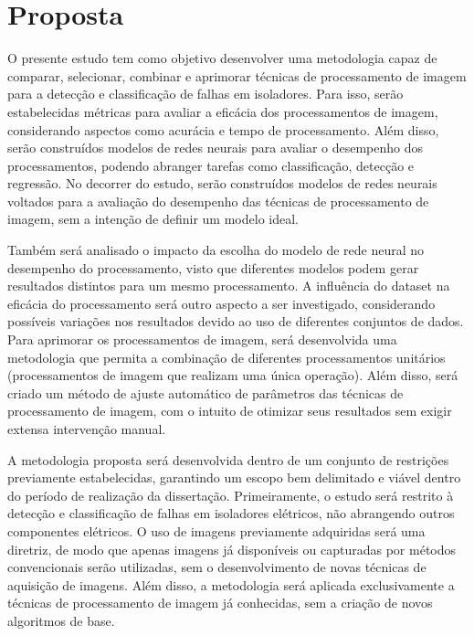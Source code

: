 \maketitle

\newpage

\section{Proposta}

O presente estudo tem como objetivo desenvolver uma metodologia capaz de comparar, selecionar, combinar e aprimorar técnicas de processamento de imagem para a detecção e classificação de falhas em isoladores. Para isso, serão estabelecidas métricas para avaliar a eficácia dos processamentos de imagem, considerando aspectos como acurácia e tempo de processamento. Além disso, serão construídos modelos de redes neurais para avaliar o desempenho dos processamentos, podendo abranger tarefas como classificação, detecção e regressão. No decorrer do estudo, serão construídos modelos de redes neurais voltados para a avaliação do desempenho das técnicas de processamento de imagem, sem a intenção de definir um modelo ideal.

Também será analisado o impacto da escolha do modelo de rede neural no desempenho do processamento, visto que diferentes modelos podem gerar resultados distintos para um mesmo processamento. A influência do dataset na eficácia do processamento será outro aspecto a ser investigado, considerando possíveis variações nos resultados devido ao uso de diferentes conjuntos de dados. Para aprimorar os processamentos de imagem, será desenvolvida uma metodologia que permita a combinação de diferentes processamentos unitários (processamentos de imagem que realizam uma única operação). Além disso, será criado um método de ajuste automático de parâmetros das técnicas de processamento de imagem, com o intuito de otimizar seus resultados sem exigir extensa intervenção manual.

A metodologia proposta será desenvolvida dentro de um conjunto de restrições previamente estabelecidas, garantindo um escopo bem delimitado e viável dentro do período de realização da dissertação. Primeiramente, o estudo será restrito à detecção e classificação de falhas em isoladores elétricos, não abrangendo outros componentes elétricos. O uso de imagens previamente adquiridas será uma diretriz, de modo que apenas imagens já disponíveis ou capturadas por métodos convencionais serão utilizadas, sem o desenvolvimento de novas técnicas de aquisição de imagens. Além disso, a metodologia será aplicada exclusivamente a técnicas de processamento de imagem já conhecidas, sem a criação de novos algoritmos de base.

